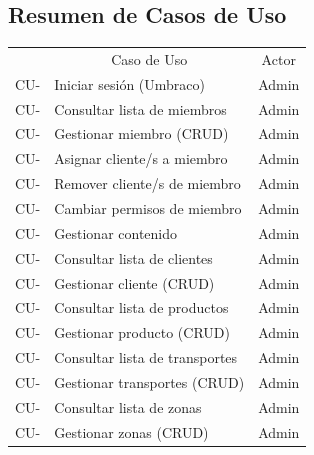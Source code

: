     \subsection{Resumen de Casos de Uso}
    \newcommand\rownumber{\stepcounter{magicrownumbers}\arabic{magicrownumbers}}
    \begin{center}
        \begin{longtable}{ | l | l | c | }
            \hline
            \rowcolor{gray!30}
            \multicolumn{1}{|c|}{ID del Caso de Uso} &
            \multicolumn{1}{|c|}{Caso de Uso} &
            \multicolumn{1}{|c|}{Actor} \\
            \hhline{===}
            \endhead

            \endfoot

            CU-\rownumber & Iniciar sesión (Umbraco) & Admin \\ \hline
            CU-\rownumber & Consultar lista de miembros & Admin \\ \hline
            CU-\rownumber & Gestionar miembro (CRUD) & Admin \\ \hline
            CU-\rownumber & Asignar cliente/s a miembro & Admin \\ \hline
            CU-\rownumber & Remover cliente/s de miembro & Admin \\ \hline
            CU-\rownumber & Cambiar permisos de miembro & Admin \\ \hline

            CU-\rownumber & Gestionar contenido & Admin \\ \hline
            CU-\rownumber & Consultar lista de clientes & Admin \\ \hline
            CU-\rownumber & Gestionar cliente (CRUD) & Admin \\ \hline
            CU-\rownumber & Consultar lista de productos & Admin \\ \hline
            CU-\rownumber & Gestionar producto (CRUD) & Admin \\ \hline
            CU-\rownumber & Consultar lista de transportes & Admin \\ \hline
            CU-\rownumber & Gestionar transportes (CRUD) & Admin \\ \hline
            CU-\rownumber & Consultar lista de zonas & Admin \\ \hline
            CU-\rownumber & Gestionar zonas (CRUD) & Admin \\ \hline


\end{longtable}
\end{center}
